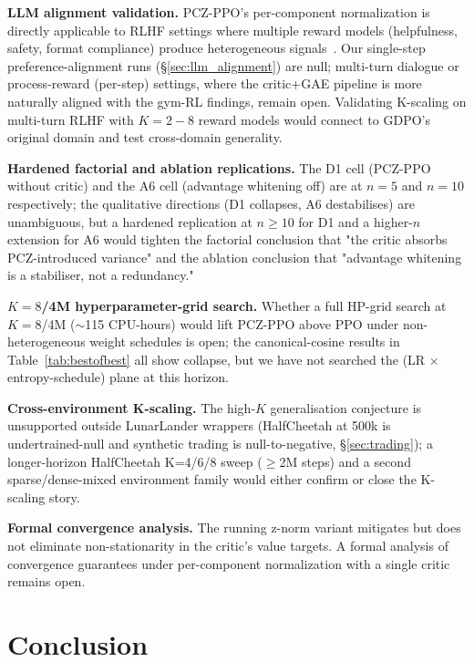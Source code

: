\documentclass[11pt,a4paper]{article}
\begin{document}
\textbf{LLM alignment validation.} PCZ-PPO's per-component normalization is directly applicable to RLHF settings where multiple reward models (helpfulness, safety, format compliance) produce heterogeneous signals~\cite{deepseek2025r1}. Our single-step preference-alignment runs (§\ref{sec:llm_alignment}) are null; multi-turn dialogue or process-reward (per-step) settings, where the critic+GAE pipeline is more naturally aligned with the gym-RL findings, remain open. Validating K-scaling on multi-turn RLHF with $K{=}2{-}8$ reward models would connect to GDPO's original domain and test cross-domain generality.

\textbf{Hardened factorial and ablation replications.} The D1 cell (PCZ-PPO without critic) and the A6 cell (advantage whitening off) are at $n{=}5$ and $n{=}10$ respectively; the qualitative directions (D1 collapses, A6 destabilises) are unambiguous, but a hardened replication at $n{\geq}10$ for D1 and a higher-$n$ extension for A6 would tighten the factorial conclusion that "the critic absorbs PCZ-introduced variance" and the ablation conclusion that "advantage whitening is a stabiliser, not a redundancy."

\textbf{$K{=}8$/4M hyperparameter-grid search.} Whether a full HP-grid search at $K{=}8$/4M ($\sim$115 CPU-hours) would lift PCZ-PPO above PPO under non-heterogeneous weight schedules is open; the canonical-cosine results in Table~\ref{tab:bestofbest} all show collapse, but we have not searched the (LR $\times$ entropy-schedule) plane at this horizon.

\textbf{Cross-environment K-scaling.} The high-$K$ generalisation conjecture is unsupported outside LunarLander wrappers (HalfCheetah at 500k is undertrained-null and synthetic trading is null-to-negative, §\ref{sec:trading}); a longer-horizon HalfCheetah K=4/6/8 sweep ($\geq$2M steps) and a second sparse/dense-mixed environment family would either confirm or close the K-scaling story.

\textbf{Formal convergence analysis.} The running z-norm variant mitigates but does not eliminate non-stationarity in the critic's value targets. A formal analysis of convergence guarantees under per-component normalization with a single critic remains open.

\section{Conclusion}
\end{document}
